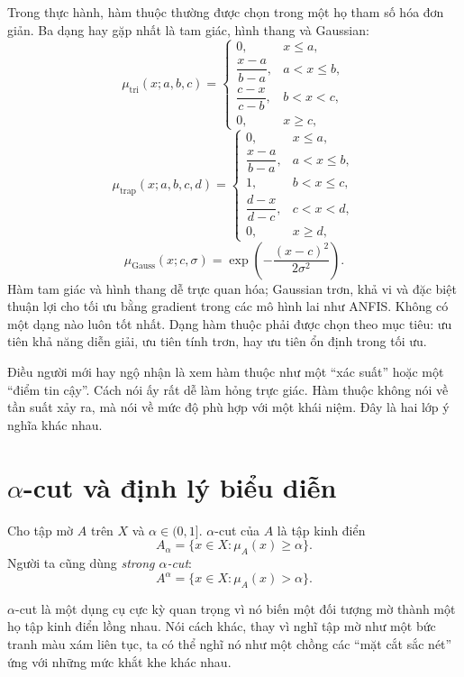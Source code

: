 Trong thực hành, hàm thuộc thường được chọn trong một họ tham số hóa đơn giản. Ba dạng hay gặp nhất là tam giác, hình thang và Gaussian:
\[
\mu_{\mathrm{tri}}(x;a,b,c)=
\begin{cases}
0, & x\le a,\\[4pt]
\dfrac{x-a}{b-a}, & a<x\le b,\\[6pt]
\dfrac{c-x}{c-b}, & b<x<c,\\[6pt]
0, & x\ge c,
\end{cases}
\]
\[
\mu_{\mathrm{trap}}(x;a,b,c,d)=
\begin{cases}
0, & x\le a,\\[4pt]
\dfrac{x-a}{b-a}, & a<x\le b,\\[6pt]
1, & b<x\le c,\\[4pt]
\dfrac{d-x}{d-c}, & c<x<d,\\[6pt]
0, & x\ge d,
\end{cases}
\]
\[
\mu_{\mathrm{Gauss}}(x;c,\sigma)=\exp\left(-\frac{(x-c)^2}{2\sigma^2}\right).
\]
Hàm tam giác và hình thang dễ trực quan hóa; Gaussian trơn, khả vi và đặc biệt thuận lợi cho tối ưu bằng gradient trong các mô hình lai như ANFIS. Không có một dạng nào luôn tốt nhất. Dạng hàm thuộc phải được chọn theo mục tiêu: ưu tiên khả năng diễn giải, ưu tiên tính trơn, hay ưu tiên ổn định trong tối ưu.

\begin{remark}
Điều người mới hay ngộ nhận là xem hàm thuộc như một ``xác suất'' hoặc một ``điểm tin cậy''. Cách nói ấy rất dễ làm hỏng trực giác. Hàm thuộc không nói về tần suất xảy ra, mà nói về mức độ phù hợp với một khái niệm. Đây là hai lớp ý nghĩa khác nhau.
\end{remark}

\section{\texorpdfstring{$\alpha$}{alpha}-cut và định lý biểu diễn}

\begin{definition}
Cho tập mờ \(A\) trên \(X\) và \(\alpha\in(0,1]\). \(\alpha\)-cut của \(A\) là tập kinh điển
\[
A_\alpha=\{x\in X:\mu_A(x)\ge \alpha\}.
\]
Người ta cũng dùng \emph{strong \(\alpha\)-cut}:
\[
A^\alpha=\{x\in X:\mu_A(x)>\alpha\}.
\]
\end{definition}

\(\alpha\)-cut là một dụng cụ cực kỳ quan trọng vì nó biến một đối tượng mờ thành một họ tập kinh điển lồng nhau. Nói cách khác, thay vì nghĩ tập mờ như một bức tranh màu xám liên tục, ta có thể nghĩ nó như một chồng các ``mặt cắt sắc nét'' ứng với những mức khắt khe khác nhau.

